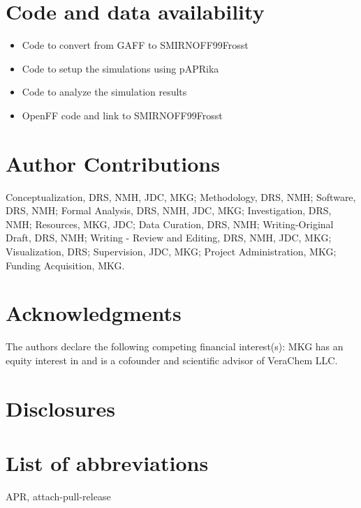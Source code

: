 \documentclass[9pt,lineno]{elife}
\begin{document}
\section{Code and data availability}
\begin{itemize}
	\item Code to convert from GAFF to SMIRNOFF99Frosst
	\item Code to setup the simulations using pAPRika
	\item Code to analyze the simulation results
	\item OpenFF code and link to SMIRNOFF99Frosst
\end{itemize}
\section{Author Contributions}
Conceptualization, DRS, NMH, JDC, MKG; Methodology, DRS, NMH; Software, DRS, NMH; Formal Analysis, DRS, NMH, JDC, MKG; Investigation, DRS, NMH; Resources, MKG, JDC;  Data Curation, DRS, NMH; Writing-Original Draft, DRS, NMH; Writing - Review and Editing, DRS, NMH, JDC, MKG; Visualization, DRS; Supervision, JDC, MKG; Project Administration, MKG; Funding Acquisition, MKG.

\section{Acknowledgments}
The authors declare the following competing financial interest(s): MKG has an equity interest in and is a cofounder and scientific advisor of VeraChem LLC.
\section{Disclosures}




\appendix
\section{List of abbreviations}
APR, attach-pull-release
\end{document}
